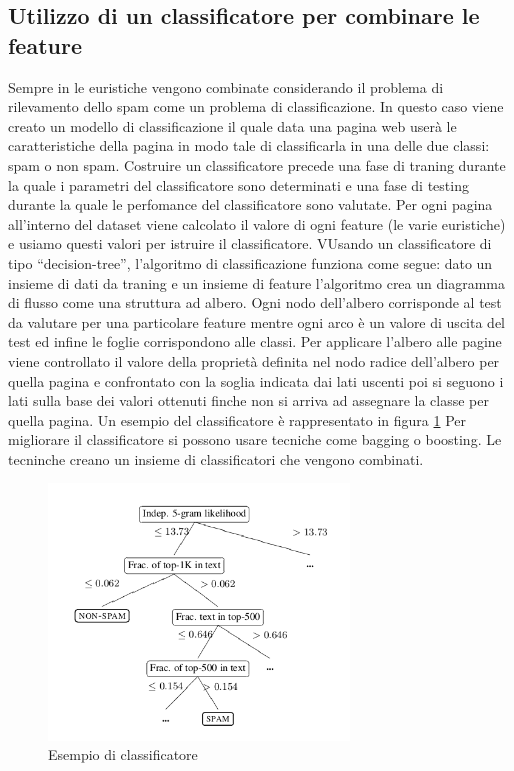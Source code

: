 \subsection{Utilizzo di un classificatore per combinare le feature}
Sempre in \cite{Ntoulas:2006:DSW:1135777.1135794} le euristiche vengono combinate considerando il problema di rilevamento dello spam come un problema di classificazione. In questo caso  viene creato un modello di classificazione il quale data una pagina web userà le caratteristiche della pagina in modo tale di classificarla in una delle due classi: spam o non spam. Costruire un classificatore precede una fase di traning durante la quale i parametri del classificatore sono determinati e una fase di testing durante la quale le perfomance del classificatore sono valutate. Per ogni pagina all'interno del dataset viene calcolato il valore di ogni feature (le varie euristiche) e usiamo questi valori per istruire il classificatore. VUsando  un classificatore di tipo ``decision-tree'', l'algoritmo di classificazione funziona come segue: dato un insieme di dati da traning e un insieme di feature l'algoritmo crea un diagramma di flusso come una struttura ad albero. Ogni nodo dell'albero corrisponde al test da valutare per una particolare feature mentre ogni arco è un valore di uscita del test ed infine le foglie corrispondono alle classi.  Per applicare l'albero alle pagine viene controllato il valore della proprietà  definita nel nodo radice dell'albero per quella pagina e confrontato con la soglia indicata dai lati uscenti poi si seguono i lati sulla base dei valori ottenuti finche non si arriva ad assegnare la classe per quella pagina. Un esempio del classificatore è rappresentato in figura \ref{fig:fetterly13} Per migliorare il classificatore si possono usare tecniche come bagging o boosting. Le tecninche creano un insieme di classificatori  che vengono combinati.
\begin{figure}[htbp]
\centering
\includegraphics[width=8cm]{immagini/fetterly/fetterly13}
\caption{Esempio di classificatore}
\label{fig:fetterly13}
\end{figure}
